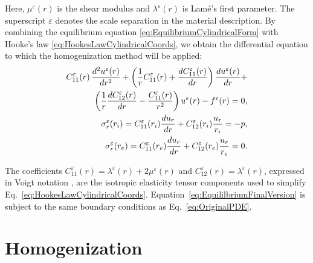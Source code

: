 \noindent Here, $\mu^{\varepsilon}(r)$ is the shear modulus and $\lambda^{\varepsilon}(r)$ is Lamé’s first parameter. The superscript $\varepsilon$ denotes the scale separation in the material description. By combining the equilibrium equation \eqref{eq:EquilibriumCylindricalForm} with Hooke’s law \eqref{eq:HookesLawCylindricalCoords}, we obtain the differential equation to which the homogenization method will be applied:
%
\def\Ceff{C_{11}^{\varepsilon}(r)}
\def\duh{\frac{du^{\varepsilon}(r)}{dr}}
\def\duhr{\frac{d^2u^{\varepsilon}(r)}{dr^2}}
%
\begin{equation}
\label{eq:EquililbriumFinalVersion}
    \begin{aligned}
        \Ceff \, \duhr + \left( \frac{1}{r} \Ceff + \frac{d\Ceff}{dr} \right) \duh +\\ \left( \frac{1}{r} \frac{d C_{12}^\varepsilon(r)}{dr} - \frac{C_{11}^\varepsilon(r)}{r^2} \right) u^\varepsilon(r) - f^{\varepsilon}(r) = 0,\\
    \Sigmari = -p,\\
    \Sigmare = 0.
    \end{aligned}
\end{equation}

\noindent The coefficients $C^{\varepsilon}_{11}(r) = \lambda^{\varepsilon}(r) + 2\mu^{\varepsilon}(r)$ and $C_{12}^{\varepsilon}(r) = \lambda^{\varepsilon}(r)$, expressed in Voigt notation \cite{Sadd2009}, are the isotropic elasticity tensor components used to simplify Eq.~\eqref{eq:HookesLawCylindricalCoords}. Equation~\eqref{eq:EquililbriumFinalVersion} is subject to the same boundary conditions as Eq.~\eqref{eq:OriginalPDE}.

\section*{Homogenization}


\newcommand{\stressSAF}[1]{\sigma^{(0)}_#1(r,y) + \varepsilon \sigma^{(1)}_#1(r,y)}
\newcommand{\totalderivative}[2]{\frac{d #1}{d #2}}
\newcommand{\partialderivative}[2]{\frac{\partial #1}{\partial #2}}
\newcommand{\StressSAF}[1]{
\sigma_{#1}^{(0)} + 
\varepsilon\sigma_{#1}^{(1)} + \varepsilon^2\sigma_{#1}^{(2)}
}
\newcommand{\DisplacementSaF}[1]{u_r^{(0)} + \varepsilon u_r^{(1)} + \varepsilon^2 u_r^{(2)}}
\newcommand{\PartialDerivative}[2]{\frac{\partial #1}{\partial #2}}
\newcommand{\SAFAfterChainRule}[3]{\partialderivative{#1^{(0)}}{#2} + 
\varepsilon \partialderivative{#1^{(1)}}{#2} + \varepsilon^2 \partialderivative{#1^{(2)}}{#2} + 
\frac{1}{\varepsilon} \partialderivative{#1^{(0)}}{#3} + \partialderivative{#1^{(1)}}{#3} + 
\varepsilon \partialderivative{#1^{(2)}}{#3}}
\newcommand{\ChainRule}{\partialderivative{}{r} + \frac{1}{\varepsilon} \partialderivative{}{y}}
\newcommand{\DispDerivative}[2]{ \partialderivative{u_r^{(#1)}}{#2} }
\newcommand{\LocalFunctions}{N_{11}(y) \DispDerivative{0}{r} + N_{12}(y)\frac{u_r^{(0)}}{r}}
\newcommand{\DeformationTheta}{\frac{u_r^{(0)}}{r}}
\newcommand{\StressROrderZero}{ \hat{C}_{11} \partialderivative{u_r^{(0)}}{r} + \hat{C}_{12}\DeformationTheta }
\newcommand{\StressThetaOrderZero}{ \hat{C}_{12} \partialderivative{u_r^{(0)}}{r} + \hat{C}_{11}\DeformationTheta}

